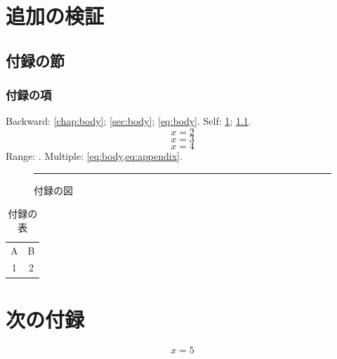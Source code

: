 \documentclass[11pt,a4paper,twoside,openany]{book}
\begin{document}
\begin{appendices}
  \chapter{追加の検証}\label{chap:appendix}
  \section{付録の節}\label{sec:appendix}
  \subsection{付録の項}\label{subsec:appendix}
  Backward: \cref{chap:body}; \cref{sec:body}; \cref{eq:body}.
  Self: \cref{chap:appendix}; \cref{sec:appendix}.
  \begin{equation}\label{eq:appendix}x=2\end{equation}
  \begin{equation}\label{eq:appendix-two}x=3\end{equation}
  \begin{equation}\label{eq:appendix-three}x=4\end{equation}
  Range: .
  Multiple: \cref{eq:body,eq:appendix}.
  \begin{figure}[htbp]
    \centering\rule{30mm}{10mm}
    \caption{付録の図}\label{fig:appendix}
  \end{figure}
  \begin{table}[htbp]
    \caption{付録の表}\label{tab:appendix}
    \centering\begin{tabular}{cc}A&B\\1&2\end{tabular}
  \end{table}
  \chapter{次の付録}\label{chap:appendix-b}
  \begin{equation}\label{eq:appendix-b}x=5\end{equation}
\end{appendices}
\end{document}
